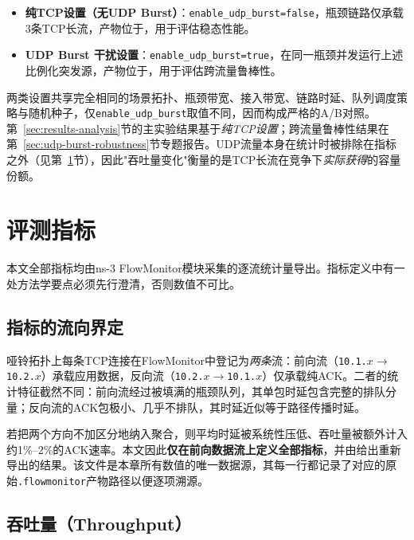 \begin{itemize}
\item \textbf{纯TCP设置（无UDP Burst）}：\texttt{enable\_udp\_burst=false}，瓶颈链路仅承载3条TCP长流，产物位于，用于评估稳态性能。
\item \textbf{UDP Burst 干扰设置}：\texttt{enable\_udp\_burst=true}，在同一瓶颈并发运行上述比例化突发源，产物位于，用于评估跨流量鲁棒性。
\end{itemize}

两类设置共享完全相同的场景拓扑、瓶颈带宽、接入带宽、链路时延、队列调度策略与随机种子，仅\texttt{enable\_udp\_burst}取值不同，因而构成严格的A/B对照。第~\ref{sec:results-analysis}节的主实验结果基于\emph{纯TCP设置}；跨流量鲁棒性结果在第~\ref{sec:udp-burst-robustness}节专题报告。UDP流量本身在统计时被排除在指标之外（见第~\ref{sec:metrics}节），因此"吞吐量变化"衡量的是TCP长流在竞争下\emph{实际获得}的容量份额。

\section{评测指标}
\label{sec:metrics}

本文全部指标均由ns-3 FlowMonitor模块采集的逐流统计量导出。指标定义中有一处方法学要点必须先行澄清，否则数值不可比。

\subsection{指标的流向界定}
\label{subsec:direction}

哑铃拓扑上每条TCP连接在FlowMonitor中登记为\emph{两条}流：前向流（\texttt{10.1.$x$}$\rightarrow$\texttt{10.2.$x$}）承载应用数据，反向流（\texttt{10.2.$x$}$\rightarrow$\texttt{10.1.$x$}）仅承载纯ACK。二者的统计特征截然不同：前向流经过被填满的瓶颈队列，其单包时延包含完整的排队分量；反向流的ACK包极小、几乎不排队，其时延近似等于路径传播时延。

若把两个方向不加区分地纳入聚合，则平均时延被系统性压低、吞吐量被额外计入约1\%--2\%的ACK速率。本文因此\textbf{仅在前向数据流上定义全部指标}，并由给出重新导出的结果。该文件是本章所有数值的唯一数据源，其每一行都记录了对应的原始\texttt{.flowmonitor}产物路径以便逐项溯源。

\subsection{吞吐量（Throughput）}


